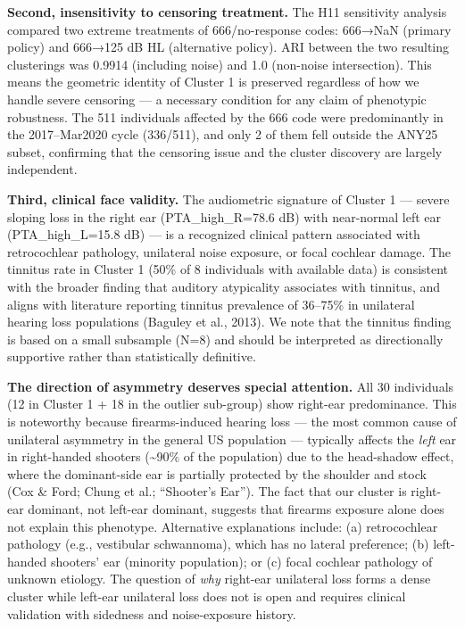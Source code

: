 \documentclass[
]{article}
\begin{document}
\textbf{Second, insensitivity to censoring treatment.} The H11 sensitivity
analysis compared two extreme treatments of 666/no-response codes: 666→NaN
(primary policy) and 666→125 dB HL (alternative policy). ARI between the two
resulting clusterings was 0.9914 (including noise) and 1.0 (non-noise
intersection). This means the geometric identity of Cluster 1 is preserved
regardless of how we handle severe censoring --- a necessary condition for any
claim of phenotypic robustness. The 511 individuals affected by the 666 code
were predominantly in the 2017--Mar2020 cycle (336/511), and only 2 of them fell
outside the ANY25 subset, confirming that the censoring issue and the cluster
discovery are largely independent.

\textbf{Third, clinical face validity.} The audiometric signature of Cluster 1
--- severe sloping loss in the right ear (PTA\_high\_R=78.6 dB) with near-normal
left ear (PTA\_high\_L=15.8 dB) --- is a recognized clinical pattern associated
with retrocochlear pathology, unilateral noise exposure, or focal cochlear
damage. The tinnitus rate in Cluster 1 (50\% of 8 individuals with available
data) is consistent with the broader finding that auditory atypicality
associates with tinnitus, and aligns with literature reporting tinnitus
prevalence of 36--75\% in unilateral hearing loss populations (Baguley et al.,
2013). We note that the tinnitus finding is based on a small subsample (N=8) and
should be interpreted as directionally supportive rather than statistically
definitive.

\textbf{The direction of asymmetry deserves special attention.} All 30
individuals (12 in Cluster 1 + 18 in the outlier sub-group) show right-ear
predominance. This is noteworthy because firearms-induced hearing loss --- the
most common cause of unilateral asymmetry in the general US population ---
typically affects the \emph{left} ear in right-handed shooters
(\textasciitilde90\% of the population) due to the head-shadow effect, where the
dominant-side ear is partially protected by the shoulder and stock (Cox \& Ford;
Chung et al.; ``Shooter's Ear''). The fact that our cluster is right-ear
dominant, not left-ear dominant, suggests that firearms exposure alone does not
explain this phenotype. Alternative explanations include: (a) retrocochlear
pathology (e.g., vestibular schwannoma), which has no lateral preference; (b)
left-handed shooters' ear (minority population); or (c) focal cochlear pathology
of unknown etiology. The question of \emph{why} right-ear unilateral loss forms
a dense cluster while left-ear unilateral loss does not is open and requires
clinical validation with sidedness and noise-exposure history.
\end{document}

